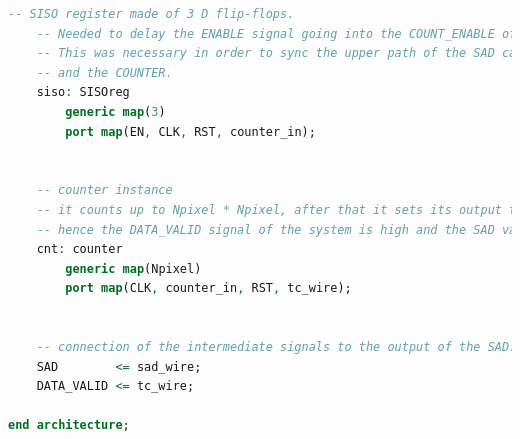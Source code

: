 \documentclass[12pt, a4paper]{article}
\begin{document}
\begin{appendices}
\begin{lstlisting}[language=vhdl]
	-- SISO register made of 3 D flip-flops. 
	-- Needed to delay the ENABLE signal going into the COUNT_ENABLE of the counter.
	-- This was necessary in order to sync the upper path of the SAD calculation
	-- and the COUNTER.
	siso: SISOreg
		generic map(3)
		port map(EN, CLK, RST, counter_in);


	-- counter instance
	-- it counts up to Npixel * Npixel, after that it sets its output to 1,
	-- hence the DATA_VALID signal of the system is high and the SAD value is frozen.
	cnt: counter
		generic map(Npixel)
		port map(CLK, counter_in, RST, tc_wire);

	
	-- connection of the intermediate signals to the output of the SAD.
	SAD        <= sad_wire;
	DATA_VALID <= tc_wire;

end architecture;


\end{lstlisting}




\end{appendices}
\end{document}
